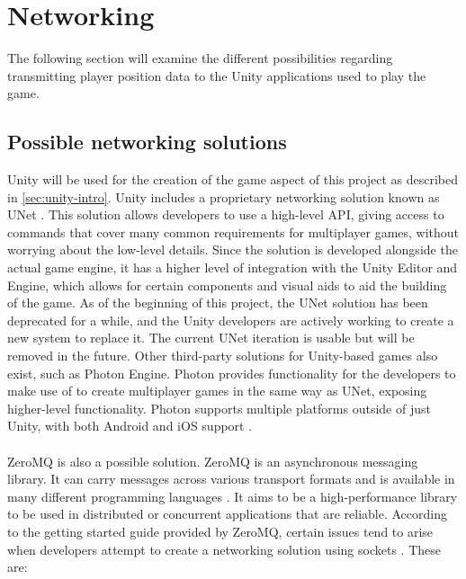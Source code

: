 \section{Networking}
The following section will examine the different possibilities regarding transmitting player position data to the Unity applications used to play the game.

\subsection{Possible networking solutions}
Unity will be used for the creation of the game aspect of this project as described in \autoref{sec:unity-intro}.
Unity includes a proprietary networking solution known as UNet \cite{unityunet}.
This solution allows developers to use a high-level API, giving access to commands that cover many common requirements for multiplayer games, without worrying about the low-level details.
Since the solution is developed alongside the actual game engine, it has a higher level of integration with the Unity Editor and Engine, which allows for certain components and visual aids to aid the building of the game.
As of the beginning of this project, the UNet solution has been deprecated for a while, and the Unity developers are actively working to create a new system to replace it.
The current UNet iteration is usable but will be removed in the future.
Other third-party solutions for Unity-based games also exist, such as Photon Engine.
Photon provides functionality for the developers to make use of to create multiplayer games in the same way as UNet, exposing higher-level functionality.
Photon supports multiple platforms outside of just Unity, with both Android and iOS support \cite{photonnet}.
\\\\
ZeroMQ is also a possible solution.
ZeroMQ is an asynchronous messaging library.
It can carry messages across various transport formats and is available in many different programming languages \cite{zeromqdoc}.
It aims to be a high-performance library to be used in distributed or concurrent applications that are reliable.
According to the getting started guide provided by ZeroMQ, certain issues tend to arise when developers attempt to create a networking solution using sockets \cite{zeromqguide}.
These are:
